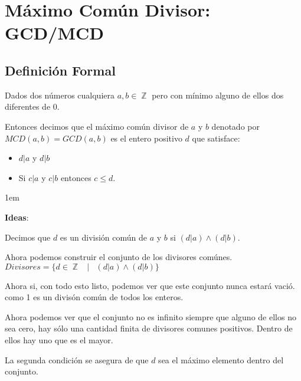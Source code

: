 \documentclass[12pt, fleqn]{report}                             %
\newenvironment{SmallIndentation}[1][0.75em]                    %
    {\begin{adjustwidth}{#1}{}\begin{footnotesize}}                 %
    {\end{footnotesize}\end{adjustwidth}}                           %
\DeclareMathOperator \Space {\quad}                             %
\DeclareMathOperator \MiniSpace {\;}                            %
\newcommand \Such {\MiniSpace|\MiniSpace}                       %
\DeclareMathOperator \Integers  {\mathbb{Z}}                     %
\begin{document}
           


    \clearpage
    \section{Máximo Común Divisor: GCD/MCD}

        \subsection*{Definición Formal}

            Dados dos números cualquiera $a, b \in \Integers$ pero con mínimo alguno de ellos dos diferentes
            de 0. 

            Entonces decimos que el máximo común divisor de $a$ y $b$ denotado por $MCD(a,b) = GCD(a,b)$
            es el entero positivo $d$ que satisface:

            \begin{itemize}
                \item $d|a$ y $d|b$
                \item Si $c|a$ y $c|b$ entonces $c \leq d$.
            \end{itemize}


            \begin{SmallIndentation}[1em]
                \textbf{Ideas}:

                Decimos que $d$ es un división común de $a$ y $b$ si $(d|a) \land (d|b)$.

                Ahora podemos construir el conjunto de los divisores comúnes.
                $Divisores = \{ d \in \Integers \Such (d|a) \land (d|b) \}$

                Ahora si, con todo esto listo, podemos ver que este conjunto nunca estará vació. 
                como 1 es un divisón común de todos los enteros.

                Ahora podemos ver que el conjunto no es infinito siempre que alguno de ellos no sea cero,
                hay sólo una cantidad finita de divisores comunes positivos. Dentro de ellos hay uno
                que es el mayor.

                La segunda condición se asegura de que $d$ sea el máximo elemento dentro del conjunto.

            \end{SmallIndentation}
\end{document}
